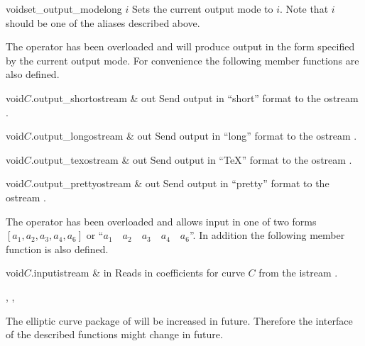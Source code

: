\begin{fcode}{void}{set_output_mode}{long $i$}
  Sets the current output mode to $i$.  Note that $i$ should be one of the aliases described
  above.
\end{fcode}

The  operator \code{<<} has been overloaded and will produce output in the form
specified by the current output mode.  For convenience the following member functions are also
defined.

\begin{cfcode}{void}{$C$.output_short}{ostream & out}
  Send output in ``short'' format to the ostream .
\end{cfcode}

\begin{cfcode}{void}{$C$.output_long}{ostream & out}
  Send output in ``long'' format to the ostream .
\end{cfcode}

\begin{cfcode}{void}{$C$.output_tex}{ostream & out}
  Send output in ``\TeX'' format to the ostream .
\end{cfcode}

\begin{cfcode}{void}{$C$.output_pretty}{ostream & out}
  Send output in ``pretty'' format to the ostream .
\end{cfcode}

The  operator \code{>>} has been overloaded and allows input in one of two forms
$[ a_1,a_2,a_3,a_4,a_6 ]$ or ``$a_1 \quad a_2 \quad a_3 \quad a_4 \quad a_6$''.  In addition the
following member function is also defined.

\begin{fcode}{void}{$C$.input}{istream & in}
  Reads in coefficients for curve $C$ from the istream .
\end{fcode}



\SEEALSO

, ,



\NOTES

The elliptic curve package of \LiDIA will be increased in future.  Therefore the interface of
the described functions might change in future.


